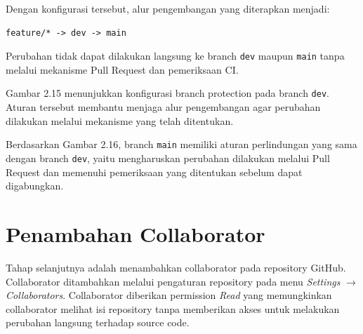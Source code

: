 Dengan konfigurasi tersebut, alur pengembangan yang diterapkan menjadi:

\begin{lstlisting}
feature/* -> dev -> main
\end{lstlisting}

Perubahan tidak dapat dilakukan langsung ke branch \texttt{dev} maupun \texttt{main} tanpa melalui mekanisme Pull Request dan pemeriksaan CI.


Gambar 2.15 menunjukkan konfigurasi branch protection pada branch \texttt{dev}. Aturan tersebut membantu menjaga alur pengembangan agar perubahan dilakukan melalui mekanisme yang telah ditentukan.


Berdasarkan Gambar 2.16, branch \texttt{main} memiliki aturan perlindungan yang sama dengan branch \texttt{dev}, yaitu mengharuskan perubahan dilakukan melalui Pull Request dan memenuhi pemeriksaan yang ditentukan sebelum dapat digabungkan.

\section{Penambahan Collaborator}

Tahap selanjutnya adalah menambahkan collaborator pada repository GitHub. Collaborator ditambahkan melalui pengaturan repository pada menu \textit{Settings} $\rightarrow$ \textit{Collaborators}. Collaborator diberikan permission \textit{Read} yang memungkinkan collaborator melihat isi repository tanpa memberikan akses untuk melakukan perubahan langsung terhadap source code.



